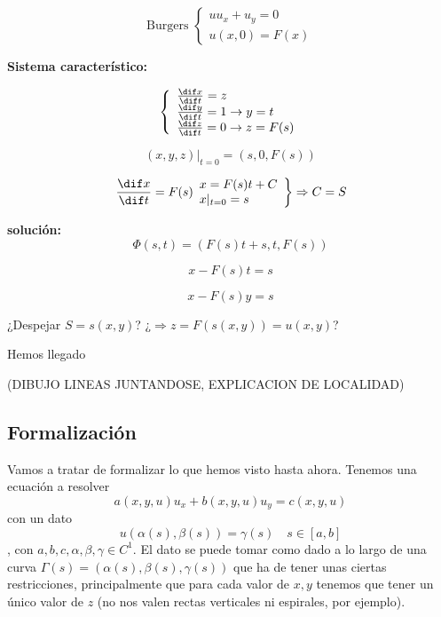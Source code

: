	\begin{example}{3}

		\[
			\text{Burgers }
			\left\{
			\begin{array}{l}
				uu_x + u_y = 0 \\
				u(x,0) = F(x)
			\end{array}
			\right.
		\]

		\textbf{Sistema característico:}

		\[
			\left\{
			\begin{array}{l}
				\frac{\dif x}{\dif t} = z \\
				\frac{\dif y}{\dif t} = 1 \rightarrow y = t \\
				\frac{\dif z}{\dif t} = 0 \rightarrow z = F(s) \\
			\end{array}
			\right.
		\]

		$$(x,y,z) |_{t=0} = (s,0,F(s))$$


		\[
			\left.
			\frac{\dif x}{\dif t} = F(s) \\
			\begin{array}{l}
				x = F(s)t + C \\
				x |_{t=0} = s
			\end{array}
			\right\} \Rightarrow C = S
		\]

		\textbf{solución:}
		$$\Phi(s,t) = (F(s) t + s, t , F(s))$$

		$$x - F(s)t = s$$

		$$x-F(s)y = s$$

		¿Despejar $S= s(x,y)$? ¿$\Rightarrow z = F(s(x,y)) = u(x,y)$?

		Hemos llegado

		(DIBUJO LINEAS JUNTANDOSE, EXPLICACION DE LOCALIDAD)

	\end{example}



\subsection{Formalización}

Vamos a tratar de formalizar lo que hemos visto hasta ahora. Tenemos una ecuación a resolver \[ a(x,y,u) u_x + b(x,y,u) u_y = c(x,y,u)\] con un dato \[ u(α(s), β(s)) = γ(s)\quad s∈[a,b]\], con $a,b,c,α,β,γ ∈ C^1$. El dato se puede tomar como dado a lo largo de una curva $Γ(s) = (α(s), β(s), γ(s))$ que ha de tener unas ciertas restricciones, principalmente que para cada valor de $x,y$ tenemos que tener un único valor de $z$ (no nos valen rectas verticales ni espirales, por ejemplo).

